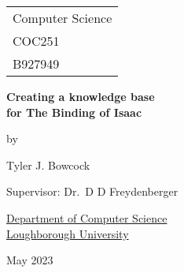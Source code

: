 \documentclass[a4paper,twoside]{report}
\begin{document}



\thispagestyle{empty}

\fancypage{}{\fbox}


\Large{
    \hfill \begin{tabular}{l}
        Computer Science \\
        COC251 \\
        B927949
    \end{tabular}
    }
    
    
    \begin{center}
\vspace*{\fill}

\Large{\textbf{Creating a knowledge base \\for The Binding of Isaac}}

\vspace*{\fill}

by

\vspace*{\fill}

Tyler J. Bowcock


\vspace*{\fill}
Supervisor: Dr.\ D D Freydenberger
\vspace*{\fill}

\underline{Department of Computer Science} \\
\underline{Loughborough University}

\vspace*{\fill}
May 2023

\end{center}


\newpage

\fancypage{}{}
\end{document}
